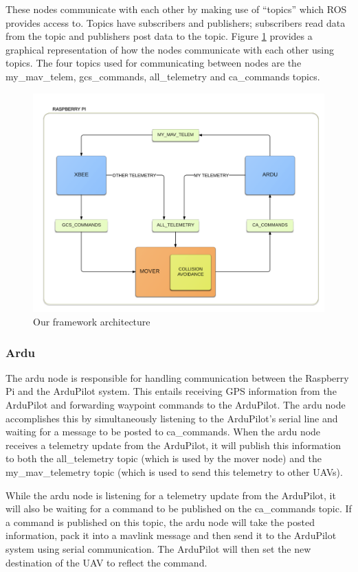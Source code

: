 \documentclass[conference]{IEEEtran}
\begin{document}
These nodes communicate with each other by making use of “topics” which ROS provides access to. Topics have subscribers and publishers; subscribers read data from the topic and publishers post data to the topic. Figure \ref{fig:ROSDistributedSystem} provides a graphical representation of how the nodes communicate with each other using topics.  The four topics used for communicating between nodes are the my\_mav\_telem, gcs\_commands, all\_telemetry and ca\_commands topics.  

\begin{figure}  [h]
  \includegraphics [width=1\columnwidth] {ROSDistributedSystem}
  \caption{Our framework architecture}
  \label{fig:ROSDistributedSystem}
\end{figure}
\subsubsection{Ardu}

The ardu node is responsible for handling communication between the Raspberry Pi and the ArduPilot system.  This entails receiving GPS information from the ArduPilot and forwarding waypoint commands to the ArduPilot. The ardu node accomplishes this by simultaneously listening to the ArduPilot's serial line and waiting for a message to be posted to ca\_commands. When the ardu node receives a telemetry update from the ArduPilot, it will publish this information to both the all\_telemetry topic (which is used by the mover node) and the my\_mav\_telemetry topic (which is used to send this telemetry to other UAVs).  

While the ardu node is listening for a telemetry update from the ArduPilot, it will also be waiting for a command to be published on the ca\_commands topic.  If a command is published on this topic, the ardu node will take the posted information, pack it into a mavlink message and then send it to the ArduPilot system using serial communication.  The ArduPilot will then set the new destination of the UAV to reflect the command.
\end{document}
